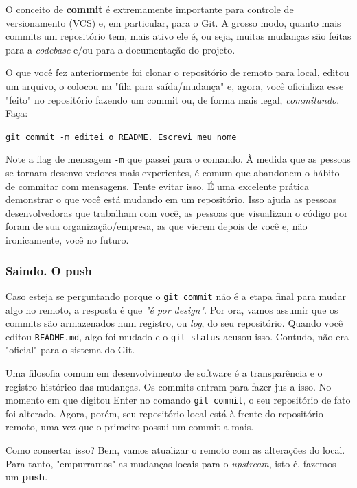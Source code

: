 \documentclass{article}
\begin{document}
  O conceito de \textbf{commit} é extremamente importante para controle de versionamento (VCS) e, em particular, para o Git. 
  A grosso modo, quanto mais commits um repositório tem, mais ativo ele é, ou seja, muitas mudanças são feitas para a \textit{codebase}
  e/ou para a documentação do projeto.

  O que você fez anteriormente foi clonar o repositório de remoto para local, editou um arquivo, 
  o colocou na "fila para saída/mudança" e, agora, você oficializa esse "feito" no repositório fazendo um commit ou,
  de forma mais legal, \textit{commitando}. Faça: 

  \vspace{1ex}
  \texttt{git commit -m \textquotesingle\!\textquotesingle editei o README. Escrevi meu nome\textquotesingle\!\textquotesingle}
  \vspace{1ex}

  Note a flag de mensagem \texttt{-m} que passei para o comando. À medida que as pessoas se tornam desenvolvedores mais experientes, 
  é comum que abandonem o hábito de commitar com mensagens. Tente evitar isso. É uma excelente prática demonstrar o que você está 
  mudando em um repositório. Isso ajuda as pessoas desenvolvedoras que trabalham com você, as pessoas que visualizam o código por foram
  de sua organização/empresa, as que vierem depois de você e, não ironicamente, você no futuro. 

  \subsubsection{Saindo. O push}

  Caso esteja se perguntando porque o \texttt{git commit} não é a etapa final para mudar algo no remoto, a resposta é que 
  \textit{"é por design"}. Por ora, vamos assumir que os commits são armazenados num registro, ou \textit{log}, do seu repositório. 
  Quando você editou \texttt{README.md}, algo foi mudado e o \texttt{git status} acusou isso. Contudo, não era "oficial" para o 
  sistema do Git. 
  
  Uma filosofia comum em desenvolvimento de software é a transparência e o registro histórico das mudanças. Os commits entram
  para fazer jus a isso. No momento em que digitou Enter no comando \texttt{git commit}, o seu repositório de fato foi alterado. 
  Agora, porém, seu repositório local está à frente do repositório remoto, uma vez que o primeiro possui um commit a mais. 

  Como consertar isso? Bem, vamos atualizar o remoto com as alterações do local. Para tanto, "empurramos" as mudanças locais 
  para o \textit{upstream}, isto é, fazemos um \textbf{push}.
\end{document}
